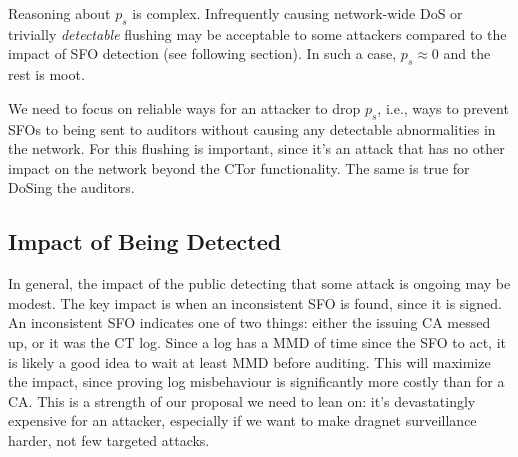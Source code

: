Reasoning about $p_s$ is complex. Infrequently causing network-wide DoS or
trivially \emph{detectable} flushing may be acceptable to some attackers
compared to the impact of SFO detection (see following section). In such a case,
$p_s \approx 0$ and the rest is moot. 

We need to focus on reliable ways for an attacker to drop $p_s$, i.e., ways to
prevent SFOs to being sent to auditors without causing any detectable
abnormalities in the network. For this flushing is important, since it's an
attack that has no other impact on the network beyond the CTor functionality.
The same is true for DoSing the auditors. 

\subsection{Impact of Being Detected}
In general, the impact of the public detecting that some attack is ongoing may
be modest. The key impact is when an inconsistent SFO is found, since it is
signed. An inconsistent SFO indicates one of two things: either the issuing CA
messed up, or it was the CT log. Since a log has a MMD of time since the SFO to
act, it is likely a good idea to wait at least MMD before auditing. This will
maximize the impact, since proving log misbehaviour is significantly more costly
than for a CA. This is a strength of our proposal we need to lean on: it's
devastatingly expensive for an attacker, especially if we want to make dragnet
surveillance harder, not few targeted attacks.
